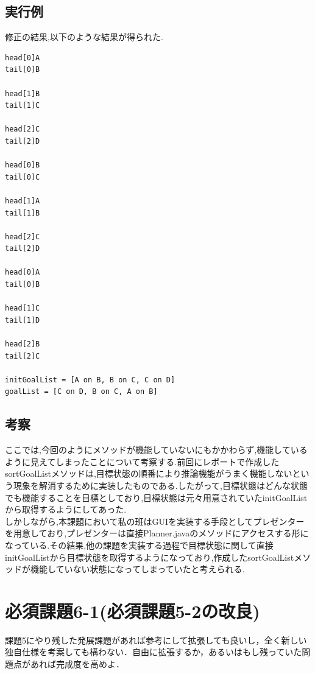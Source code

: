 \documentclass[12pt]{jarticle}
\begin{document}
\subsection{実行例}
修正の結果,以下のような結果が得られた.
\begin{lstlisting}[caption=実行結果, label=mid]
head[0]A
tail[0]B

head[1]B
tail[1]C

head[2]C
tail[2]D

head[0]B
tail[0]C

head[1]A
tail[1]B

head[2]C
tail[2]D

head[0]A
tail[0]B

head[1]C
tail[1]D

head[2]B
tail[2]C

initGoalList = [A on B, B on C, C on D]
goalList = [C on D, B on C, A on B]
\end{lstlisting}


\subsection{考察}
ここでは,今回のようにメソッドが機能していないにもかかわらず,機能しているように見えてしまったことについて考察する.前回にレポートで作成したsortGoalListメソッドは,目標状態の順番により推論機能がうまく機能しないという現象を解消するために実装したものである.したがって,目標状態はどんな状態でも機能することを目標としており,目標状態は元々用意されていたinitGoalListから取得するようにしてあった.\\
しかしながら,本課題において私の班はGUIを実装する手段としてプレゼンターを用意しており,プレゼンターは直接Planner.javaのメソッドにアクセスする形になっている.その結果,他の課題を実装する過程で目標状態に関して直接initGoalListから目標状態を取得するようになっており,作成したsortGoalListメソッドが機能していない状態になってしまっていたと考えられる.\\



\section{必須課題6-1(必須課題5-2の改良)}
\begin{screen}
課題5にやり残した発展課題があれば参考にして拡張しても良いし，全く新しい独自仕様を考案しても構わない．自由に拡張するか，あるいはもし残っていた問題点があれば完成度を高めよ．
\end{screen}
\end{document}
